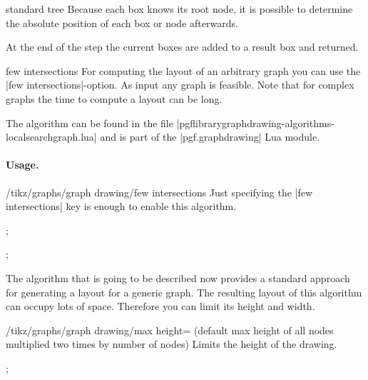 \begin{gdalgorithm}{standard tree}
Because each box knows its root node, it is possible to determine the absolute position of each box or node afterwards. 

At the end of the step the current boxes are added to a result box and returned.
\end{gdalgorithm}

\begin{gdalgorithm}{few intersections}
For computing the layout of an arbitrary graph you can use the |few intersections|-option. As input any graph is feasible. Note that for complex graphs the time to compute a layout can be long.

The algorithm can be found in the file
|pgflibrarygraphdrawing-algorithms-localsearchgraph.lua| and is part
of the |pgf.graphdrawing| Lua module.

\paragraph{Usage.}

\begin{key}{/tikz/graphs/graph drawing/few intersections}
  Just specifying the |few intersections| key is enough to enable this algorithm.
\end{key}

\begin{codeexample}[]
\tikz [graph drawing={few intersections}, scale=2]
  ;
\end{codeexample}

\begin{codeexample}[]
\tikz [graph drawing={few intersections}, scale=2]
  ;
\end{codeexample}

The algorithm that is going to be described now provides a standard approach for generating a layout for a generic graph.
The resulting layout of this algorithm can occupy lots of space. Therefore you can limit its height and width.

\begin{key}{/tikz/graphs/graph drawing/max height= (default max height of all nodes multiplied two times by number of nodes)}
Limits the height of the drawing.
\begin{codeexample}[]
\tikz [graph drawing={few intersections, max height=50pt}, scale=2]
  ;
\end{codeexample}
\end{key}


\end{gdalgorithm}
